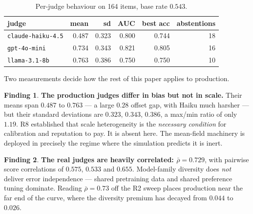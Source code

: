 \documentclass[11pt]{article}
\theoremstyle{definition}
\newtheorem{finding}{Finding}
\newcommand{\rhobar}{\ensuremath{\bar{\rho}}}
\begin{document}
\begin{table}[H]\centering
\begin{tabular}{lrrrrr}
\toprule
judge & mean & sd & AUC & best acc & abstentions \\
\midrule
\texttt{claude-haiku-4.5} & 0.487 & 0.323 & 0.800 & 0.744 & 18 \\
\texttt{gpt-4o-mini}      & 0.734 & 0.343 & 0.821 & 0.805 & 16 \\
\texttt{llama-3.1-8b}     & 0.763 & 0.386 & 0.750 & 0.750 & 10 \\
\bottomrule
\end{tabular}
\caption{Per-judge behaviour on 164 items, base rate $0.543$.}
\end{table}

Two measurements decide how the rest of this paper applies to production.

\begin{finding}
\label{f:scale}
\textbf{The production judges differ in bias but not in scale.} Their means span $0.487$ to
$0.763$ --- a large $0.28$ offset gap, with Haiku much harsher --- but their standard
deviations are $0.323$, $0.343$, $0.386$, a max/min ratio of only $\mathbf{1.19}$. R8
established that scale heterogeneity is the \emph{necessary condition} for calibration and
reputation to pay. It is absent here. The mean-field machinery is deployed in precisely the
regime where the simulation predicts it is inert.
\end{finding}

\begin{finding}
\label{f:rho}
\textbf{The real judges are heavily correlated: $\rhobar = 0.729$}, with pairwise score
correlations of $0.575$, $0.533$ and $0.655$. Model-family diversity does \emph{not} deliver
error independence --- shared pretraining data and shared preference tuning dominate. Reading
$\rhobar=0.73$ off the R2 sweep places production near the far end of the curve, where the
diversity premium has decayed from $0.044$ to $0.026$.
\end{finding}
\end{document}
